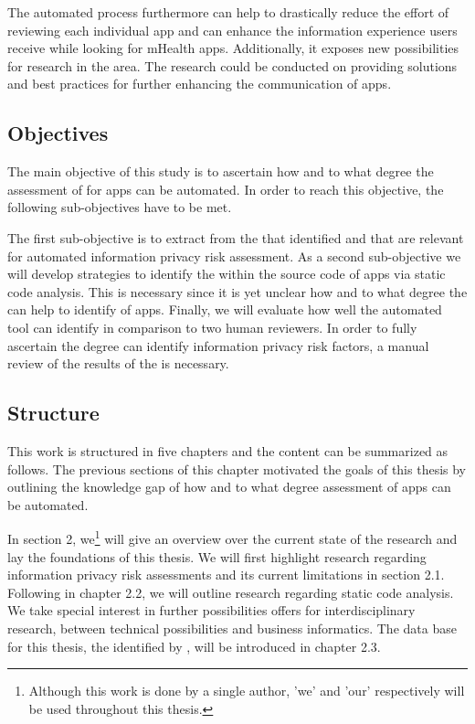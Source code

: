 The automated process furthermore can help to drastically reduce the effort of reviewing each individual app and can enhance the information experience users receive while looking for mHealth apps.
Additionally, it exposes new possibilities for research in the \ipr area. 
The research could be conducted on providing solutions and best practices for further enhancing the \ipr communication of apps.

\subsection{Objectives}\label{chapter:Objectives}

The main objective of this study is to ascertain how and to what degree the assessment of \iprfs for \mH apps can be automated.
In order to reach this objective, the following sub-objectives have to be met.

The first sub-objective is to extract \iprfs from the \ipp that \textcite{Dehling2016} identified and that are relevant for automated information privacy risk assessment.
As a second sub-objective we will develop strategies to identify the \iprfs within the source code of \mH apps via static code analysis.
This is necessary since it is yet unclear how and to what degree the \sca can help to identify \iprfs of \mH apps. 
Finally, we will evaluate how well the automated \pra tool can identify \iprfs in comparison to two human reviewers.
In order to fully ascertain the degree \sca can identify information privacy risk factors, a manual review of the results of the \sca is necessary.

\subsection{Structure}

This work is structured in five chapters and the content can be summarized as follows. 
The previous sections of this chapter motivated the goals of this thesis by outlining the knowledge gap of how and to what degree \ipr assessment of \mH apps can be automated.

In section 2, we\footnote{Although this work is done by a single author, 'we' and 'our' respectively will be used throughout this thesis.} will give an overview over the current state of the research and lay the foundations of this thesis.
We will first highlight research regarding information privacy risk assessments and its current limitations in section 2.1.
Following in chapter 2.2, we will outline research regarding static code analysis. 
We take special interest in further possibilities \sca offers for interdisciplinary research, between technical possibilities and business informatics.
The data base for this thesis, the \ipp identified by \textcite{Dehling2016}, will be introduced in chapter 2.3.

